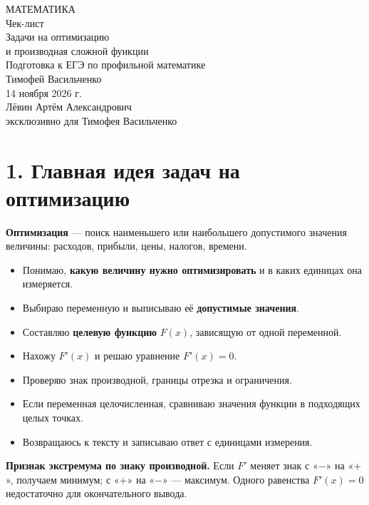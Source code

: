 \documentclass[a4paper,11pt]{article}
\newcommand{\topic}[1]{\Needspace{5\baselineskip}\section*{\color{darkaccent}#1}\vspace{-2mm}}
\newcommand{\key}[1]{\textcolor{darkaccent}{\textbf{#1}}}
\begin{document}
\thispagestyle{empty}
\begin{center}
\vspace*{23mm}
{\Large\color{darkaccent}МАТЕМАТИКА}\\[25mm]
{\Huge\color{textgray}Чек-лист}\\[13mm]
{\LARGE\color{accent}Задачи на оптимизацию}\\[3mm]
{\Large\color{accent}и производная сложной функции}\\[22mm]
{\large Подготовка к ЕГЭ по профильной математике}\\[43mm]
{\Large Тимофей Васильченко}\\[17mm]
{\large 14 ноября 2026 г.}\\[20mm]
{\normalsize Лёвин Артём Александрович}\\[2mm]
{\normalsize эксклюзивно для Тимофея Васильченко}
\end{center}
\vfill
\begin{center}
\end{center}
\clearpage

\topic{1. Главная идея задач на оптимизацию}
\key{Оптимизация} — поиск наименьшего или наибольшего допустимого значения величины: расходов, прибыли, цены, налогов, времени.

\begin{itemize}[label=$\square$]
\item Понимаю, \textbf{какую величину нужно оптимизировать} и в каких единицах она измеряется.
\item Выбираю переменную и выписываю её \textbf{допустимые значения}.
\item Составляю \textbf{целевую функцию} $F(x)$, зависящую от одной переменной.
\item Нахожу $F'(x)$ и решаю уравнение $F'(x)=0$.
\item Проверяю знак производной, границы отрезка и ограничения.
\item Если переменная целочисленная, сравниваю значения функции в подходящих целых точках.
\item Возвращаюсь к тексту и записываю ответ с единицами измерения.
\end{itemize}

\key{Признак экстремума по знаку производной.}
Если $F'$ меняет знак с «$-$» на «$+$», получаем минимум; с «$+$» на «$-$» — максимум. Одного равенства $F'(x)=0$ недостаточно для окончательного вывода.
\end{document}
